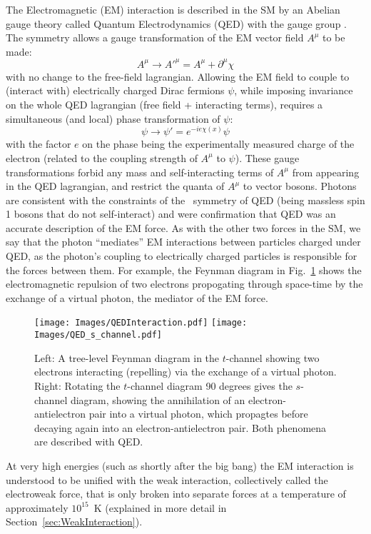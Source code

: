 
The Electromagnetic (EM) interaction is described in the SM by an Abelian gauge theory called Quantum Electrodynamics (QED) with the gauge group \Uone. The \Uone symmetry allows a gauge transformation of the EM vector field $A^{\mu}$ to be made:
\begin{equation}
    A^{\mu} \rightarrow A'^{\mu} = A^{\mu} + \partial^{\mu}\chi
\end{equation}
with no change to the free-field lagrangian. Allowing the EM field to couple to (interact with) electrically charged Dirac fermions $\psi$, while imposing invariance on the whole QED lagrangian (free field + interacting terms), requires a simultaneous (and local) phase transformation of $\psi$:
\begin{equation}
    \psi \rightarrow \psi' = e^{-ie\chi(x)}\psi
\end{equation}
with the factor $e$ on the phase being the experimentally measured charge of the electron (related to the coupling strength of $A^{\mu}$ to $\psi$). These gauge transformations forbid any mass and self-interacting terms of $A^{\mu}$ from appearing in the QED lagrangian, and restrict the quanta of $A^{\mu}$ to vector bosons. Photons are consistent with the constraints of the \Uone~symmetry of QED (being massless spin 1 bosons that do not self-interact) and were confirmation that QED was an accurate description of the EM force. As with the other two forces in the SM, we say that the photon ``mediates'' EM interactions between particles charged under QED, as the photon's coupling to electrically charged particles is responsible for the forces between them. For example, the Feynman diagram in Fig.~\ref{fig:QEDFeynmanDiagram} shows the electromagnetic repulsion of two electrons propogating through space-time by the exchange of a virtual photon, the mediator of the EM force. 
\begin{figure}[H]
    \centering
    \vspace{0.05\textwidth}
    \texttt{[image: Images/QEDInteraction.pdf]}\hspace{0.1\textwidth}
    \texttt{[image: Images/QED\_s\_channel.pdf]}\vspace{0.05\textwidth}
    \caption{Left: A tree-level Feynman diagram in the $t$-channel showing two electrons interacting (repelling) via the exchange of a virtual photon. Right: Rotating the $t$-channel diagram 90 degrees gives the $s$-channel diagram, showing the annihilation of an electron-antielectron pair into a virtual photon, which propagtes before decaying again into an electron-antielectron pair. Both phenomena are described with QED.}
    \label{fig:QEDFeynmanDiagram}
\end{figure}
At very high energies (such as shortly after the big bang) the EM interaction is understood to be unified with the weak interaction, collectively called the electroweak force, that is only broken into separate forces at a temperature of approximately $10^{15}$~K (explained in more detail in Section~\ref{sec:WeakInteraction}).